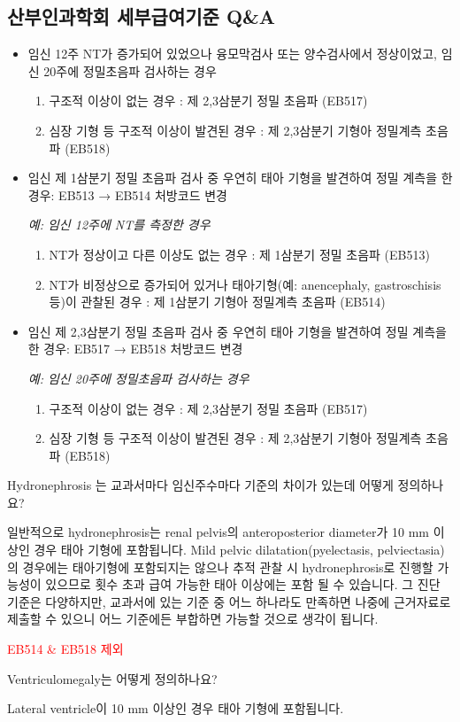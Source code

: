 \subsection{산부인과학회 세부급여기준 Q\&A}
\begin{itemize}\tightlist
\item 임신 12주 NT가 증가되어 있었으나 융모막검사 또는 양수검사에서 정상이었고, 임신 20주에 정밀초음파 검사하는 경우
	\begin{enumerate}[①]\tightlist
	\item 구조적 이상이 없는 경우 : 제 2,3삼분기 정밀 초음파 (EB517)
	\item 심장 기형 등 구조적 이상이 발견된 경우 : 제 2,3삼분기 기형아 정밀계측 초음파 (EB518)
	\end{enumerate}
\item 임신 제 1삼분기 정밀 초음파 검사 중 우연히 태아 기형을 발견하여 정밀 계측을 한 경우: EB513 → EB514 처방코드 변경 \par
\emph{예: 임신 12주에 NT를 측정한 경우}
	\begin{enumerate}[①]\tightlist
	\item  NT가 정상이고 다른 이상도 없는 경우 : 제 1삼분기 정밀 초음파 (EB513)
	\item  NT가 비정상으로 증가되어 있거나 태아기형(예: anencephaly, gastroschisis 등)이 관찰된 경우 : 제 1삼분기 기형아 정밀계측 초음파 (EB514)
	\end{enumerate}
\item 임신 제 2,3삼분기 정밀 초음파 검사 중 우연히 태아 기형을 발견하여 정밀 계측을 한 경우: EB517 → EB518 처방코드 변경\par
\emph{예: 임신 20주에 정밀초음파 검사하는 경우}
	\begin{enumerate}[①]\tightlist
	\item  구조적 이상이 없는 경우 : 제 2,3삼분기 정밀 초음파 (EB517)
	\item  심장 기형 등 구조적 이상이 발견된 경우 : 제 2,3삼분기 기형아 정밀계측 초음파 (EB518)
	\end{enumerate}
\end{itemize}
\prezi{\clearpage}	
\begin{commentbox}{Hydronephrosis}
는 교과서마다 임신주수마다 기준의 차이가 있는데 어떻게 정의하나요? \par
일반적으로 hydronephrosis는 renal pelvis의 anteroposterior diameter가 10 mm 이상인 경우 태아 기형에 포함됩니다. Mild pelvic dilatation(pyelectasis, pelviectasia)의 경우에는 태아기형에 포함되지는 않으나 추적 관찰 시 hydronephrosis로 진행할 가능성이 있으므로 횟수 초과 급여 가능한 태아 이상에는 포함
될 수 있습니다. 그 진단 기준은 다양하지만, 교과서에 있는 기준 중 어느 하나라도 만족하면 나중에 근거자료로 제출할 수 있으니 어느 기준에든 부합하면 가능할 것으로 생각이 됩니다.
\end{commentbox}
\prezi{\clearpage}
\textcolor{red}{EB514 \& EB518 제외}\par
\prezi{\clearpage}
Ventriculomegaly는 어떻게 정의하나요?
\begin{quotebox}
Lateral ventricle이 10 mm 이상인 경우 태아 기형에 포함됩니다. 
\end{quotebox}
\prezi{\clearpage}
